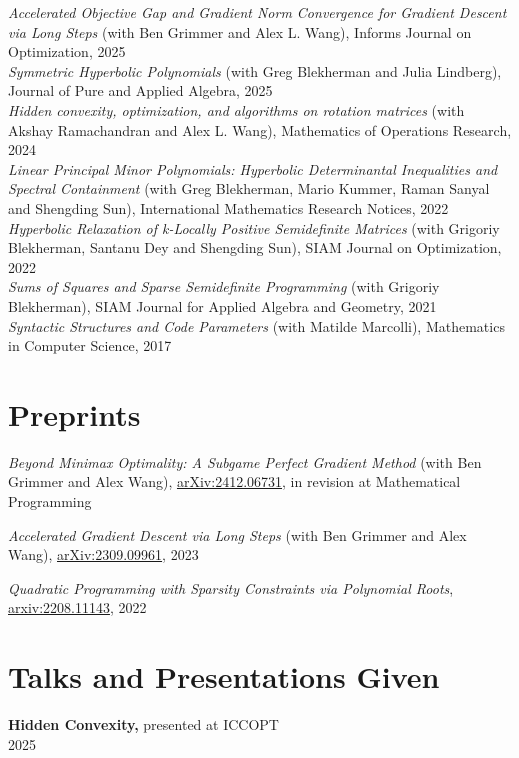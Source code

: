 \documentclass[margin]{res}
\begin{document}
\begin{resume}
\emph{Accelerated Objective Gap and Gradient Norm Convergence for Gradient Descent via Long Steps} (with Ben Grimmer and Alex L. Wang), Informs Journal on Optimization, 2025\\

\emph{Symmetric Hyperbolic Polynomials} (with Greg Blekherman and Julia Lindberg), Journal of Pure and Applied Algebra, 2025\\

\emph{Hidden convexity, optimization, and algorithms on rotation matrices  } (with Akshay Ramachandran and Alex L. Wang), Mathematics of Operations Research, 2024\\

\emph{Linear Principal Minor Polynomials: Hyperbolic Determinantal Inequalities and Spectral Containment } (with Greg Blekherman, Mario Kummer, Raman Sanyal and Shengding Sun), International Mathematics Research Notices, 2022\\

\emph{Hyperbolic Relaxation of k-Locally Positive Semidefinite Matrices} (with Grigoriy Blekherman, Santanu Dey and Shengding Sun), SIAM Journal on Optimization, 2022\\

\emph{Sums of Squares and Sparse Semidefinite Programming} (with Grigoriy Blekherman),
SIAM Journal for Applied Algebra and Geometry, 2021
\\

\emph{Syntactic Structures and Code Parameters} (with Matilde Marcolli), Mathematics in Computer Science, 2017\\

\section{Preprints}
\emph{Beyond Minimax Optimality: A Subgame Perfect Gradient Method} (with Ben Grimmer and Alex Wang), \href{https://arxiv.org/abs/2412.06731}{arXiv:2412.06731}, in revision at Mathematical Programming

\emph{Accelerated Gradient Descent via Long Steps} (with Ben Grimmer and Alex Wang), \href{https://arxiv.org/abs/2309.09961}{arXiv:2309.09961}, 2023

\emph{Quadratic Programming with Sparsity Constraints via Polynomial Roots}, 
\href{https://arxiv.org/abs/2208.11143}{arxiv:2208.11143}, 2022

\section{Talks and Presentations Given}
{\bf  Hidden Convexity,} presented at ICCOPT \\ 2025


\end{resume}
\end{document}
